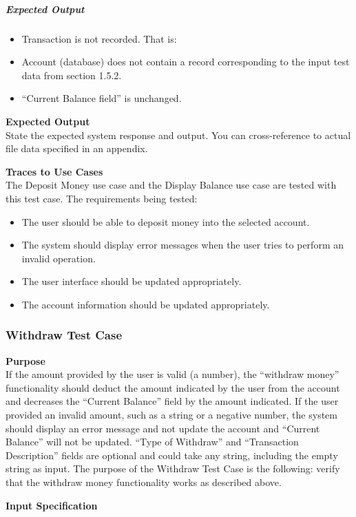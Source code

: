 \documentclass[12pt]{article}
\begin{document}
\subparagraph{Expected Output}
\begin{itemize}
  \item Transaction is not recorded. That is:
  \item Account (database) does not contain a record corresponding to the input test data from section 1.5.2.
  \item “Current Balance field” is unchanged.
\end{itemize}

\noindent
{\bf Expected Output}\\
State the expected system response and output.
You can cross-reference to actual file data specified in an appendix.

\noindent
{\bf Traces to Use Cases}\\
The Deposit Money use case and the Display Balance use case are tested with this test case. The requirements being tested:
\begin{itemize}
  \item The user should be able to deposit money into the selected account.
  \item The system should display error messages when the user tries to perform an invalid operation.
  \item The user interface should be updated appropriately.
  \item The account information should be updated appropriately.
\end{itemize}

\subsubsection{Withdraw Test Case} \label{tc:2}

\noindent
{\bf Purpose}\\
If the amount provided by the user is valid (a number), the “withdraw money” functionality should deduct the amount indicated by the user from the account and decreases the “Current Balance” field by the amount indicated. If the user provided an invalid amount, such as a string or a negative number, the system should display an error message and not update the account and “Current Balance” will not be updated. “Type of Withdraw” and “Transaction Description” fields are optional and could take any string, including the empty string as input. The purpose of the Withdraw Test Case is the following: verify that the withdraw money functionality works as described above.

\noindent
{\bf Input Specification}
\end{document}
